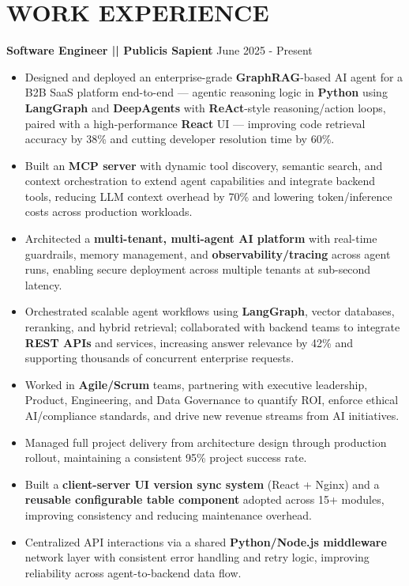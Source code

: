 \documentclass[100pt,a4paper]{article}
\begin{document}
\section*{WORK EXPERIENCE}
\textbf{Software Engineer || Publicis Sapient}
\hfill June 2025 - Present
\begin{itemize}
\vspace{2pt}
\item {Designed and deployed an enterprise-grade \textbf{GraphRAG}-based AI agent for a B2B SaaS platform end-to-end — agentic reasoning logic in \textbf{Python} using \textbf{LangGraph} and \textbf{DeepAgents} with \textbf{ReAct}-style reasoning/action loops, paired with a high-performance \textbf{React} UI — improving code retrieval accuracy by 38\% and cutting developer resolution time by 60\%.}
\item {Built an \textbf{MCP server} with dynamic tool discovery, semantic search, and context orchestration to extend agent capabilities and integrate backend tools, reducing LLM context overhead by 70\% and lowering token/inference costs across production workloads.}
\item {Architected a \textbf{multi-tenant, multi-agent AI platform} with real-time guardrails, memory management, and \textbf{observability/tracing} across agent runs, enabling secure deployment across multiple tenants at sub-second latency.}
\item {Orchestrated scalable agent workflows using \textbf{LangGraph}, vector databases, reranking, and hybrid retrieval; collaborated with backend teams to integrate \textbf{REST APIs} and services, increasing answer relevance by 42\% and supporting thousands of concurrent enterprise requests.}
\item {Worked in \textbf{Agile/Scrum} teams, partnering with executive leadership, Product, Engineering, and Data Governance to quantify ROI, enforce ethical AI/compliance standards, and drive new revenue streams from AI initiatives.}
\item {Managed full project delivery from architecture design through production rollout, maintaining a consistent 95\% project success rate.}
\item {Built a \textbf{client-server UI version sync system} (React + Nginx) and a \textbf{reusable configurable table component} adopted across 15+ modules, improving consistency and reducing maintenance overhead.}
\item {Centralized API interactions via a shared \textbf{Python/Node.js middleware} network layer with consistent error handling and retry logic, improving reliability across agent-to-backend data flow.}

\end{itemize}
\end{document}
